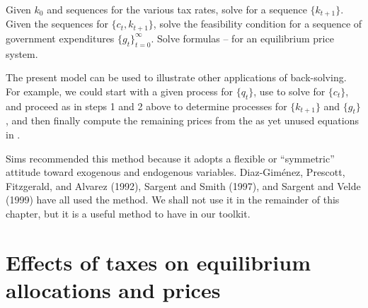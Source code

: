 \medskip
{} Given $k_0$ and sequences for the various
tax rates, solve  for a sequence $\{k_{t+1}\}$.
\medskip
{} Given the sequences for $\{c_t, k_{t+1}\}$,
solve the feasibility condition 
for a sequence of government expenditures $\{g_t\}_{t=0}^\infty$.
\medskip
{} Solve formulas --
for an equilibrium price system.
\medskip

The present model can be used to illustrate other applications of
back-solving. For example, we could start with a given
 process for
$\{q_t\}$,  use  to solve for $\{c_t\}$, and
proceed as in steps 1 and 2 above to determine processes for
$\{k_{t+1}\}$ and $\{g_t\}$, and then finally  compute the
remaining prices from the as yet unused equations in
. 

  Sims recommended this method because it adopts a flexible or
``symmetric'' attitude toward exogenous and endogenous variables.
Diaz-Gim\' enez,  Prescott, Fitzgerald, and
 Alvarez (1992), Sargent and Smith (1997), and Sargent and Velde
(1999) have all used the method. We shall not use it in the
remainder of this chapter, but it is a useful method to have in
our toolkit.    

\section{Effects of taxes on equilibrium allocations and prices}

